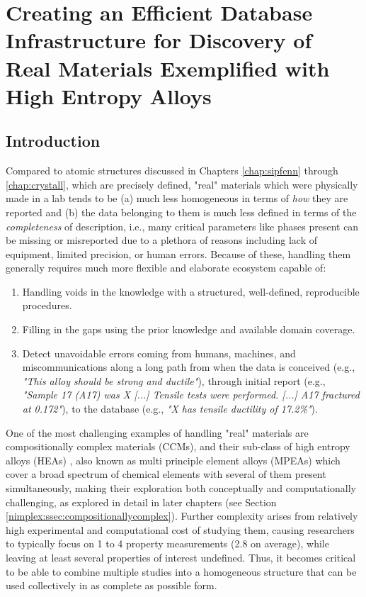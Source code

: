 \chapter{Creating an Efficient Database Infrastructure for Discovery of Real Materials Exemplified with High Entropy Alloys} \label{chap:ultera}

\section{Introduction} \label{ultera:sec:intro}

Compared to atomic structures discussed in Chapters \ref{chap:sipfenn} through \ref{chap:crystall}, which are precisely defined, "real" materials which were physically made in a lab tends to be (a) much less homogeneous in terms of \textit{how} they are reported and (b) the data belonging to them is much less defined in terms of the \textit{completeness} of description, i.e., many critical parameters like phases present can be missing or misreported due to a plethora of reasons including lack of equipment, limited precision, or human errors. Because of these, handling them generally requires much more flexible and elaborate ecosystem capable of:
\begin{enumerate}
    \item Handling voids in the knowledge with a structured, well-defined, reproducible procedures. 
    \item Filling in the gaps using the prior knowledge and available domain coverage.
    \item Detect unavoidable errors coming from humans, machines, and miscommunications along a long path from when the data is conceived (e.g., \textit{"This alloy should be strong and ductile"}), through initial report (e.g., \textit{"Sample 17 (A17) was X [...] Tensile tests were performed. [...] A17 fractured at 0.172"}), to the database (e.g., \textit{"X has tensile ductility of 17.2\%"}).
\end{enumerate}

One of the most challenging examples of handling "real" materials are compositionally complex materials (CCMs), and their sub-class of high entropy alloys (HEAs) \cite{Yeh2004NanostructuredOutcomes, Cantor2004MicrostructuralAlloys}, also known as multi principle element alloys (MPEAs) \cite{Borg2020ExpandedAlloys} which cover a broad spectrum of chemical elements with several of them present simultaneously, making their exploration both conceptually and computationally challenging, as explored in detail in later chapters (see Section \ref{nimplex:ssec:compositionallycomplex}). Further complexity arises from relatively high experimental and computational cost of studying them, causing researchers to typically focus on 1 to 4 property measurements (2.8 on average), while leaving at least several properties of interest undefined. Thus, it becomes critical to be able to combine multiple studies into a homogeneous structure that can be used collectively in as complete as possible form.

